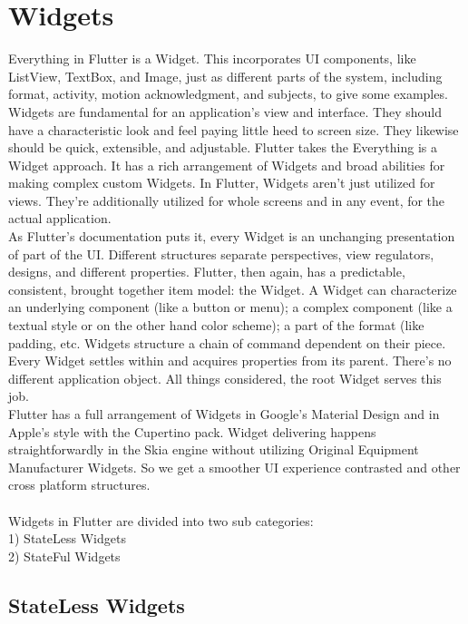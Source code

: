\chapter{Widgets}

Everything in Flutter is a Widget. This incorporates UI components, like ListView,
TextBox, and Image, just as different parts of the system, including format, activity, motion acknowledgment, and subjects, to give some examples.\\
Widgets are fundamental for an application's view and interface. They should have a characteristic look and
feel paying little heed to screen size. They likewise should be quick, extensible, and adjustable. Flutter takes the
Everything is a Widget approach. It has a rich arrangement of Widgets and broad abilities for making
complex custom Widgets. In Flutter, Widgets aren't just utilized for views. They're additionally utilized for whole
screens and in any event, for the actual application.\\
As Flutter's documentation puts it, every Widget is an unchanging presentation of part of the
UI. Different structures separate perspectives, view regulators, designs, and different properties.
Flutter, then again, has a predictable, consistent, brought together item model: the Widget.
A Widget can characterize an underlying component (like a button or menu); a complex component (like a textual style
or on the other hand color scheme); a part of the format (like padding, etc.
Widgets structure a chain of command dependent on their piece. Every Widget settles within and acquires
properties from its parent. There's no different application object. All things considered, the root Widget serves this
job.\\
Flutter has a full arrangement of Widgets in Google's Material Design and in Apple's style with the
Cupertino pack. Widget delivering happens straightforwardly in the Skia engine without utilizing Original
Equipment Manufacturer Widgets. So we get a smoother UI experience contrasted and other cross
platform structures.\\
\\
Widgets in Flutter are divided into two sub categories:\\
1) StateLess Widgets\\
2) StateFul Widgets\\

\section{StateLess Widgets}

